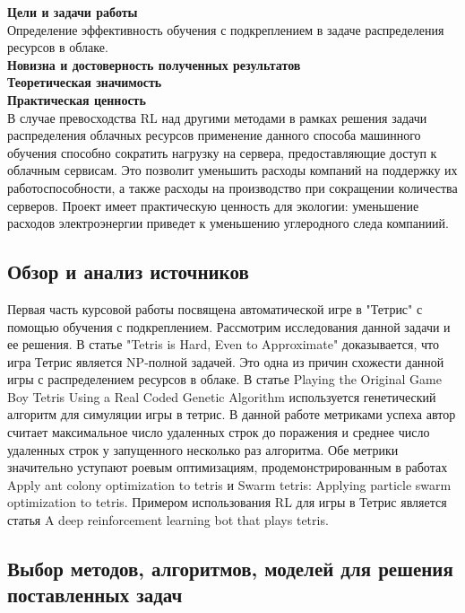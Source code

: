 \documentclass{article}
\begin{document}
\textbf{Цели и задачи работы}\\
Определение эффективность обучения с подкреплением в задаче распределения ресурсов в облаке.\\
\textbf{Новизна и достоверность полученных результатов}\\
\textbf{Теоретическая значимость}\\
\textbf{Практическая ценность}\\
В случае превосходства RL над другими методами в рамках решения задачи распределения облачных ресурсов применение данного способа машинного обучения способно сократить нагрузку на сервера, предоставляющие доступ к облачным сервисам. Это позволит уменьшить расходы компаний на поддержку их работоспособности, а также расходы на производство при сокращении количества серверов. Проект имеет практическую ценность для экологии: уменьшение расходов электроэнергии приведет к уменьшению углеродного следа компаниий.	\\
\newpage
\begin{center}
\section {Обзор и анализ источников}
\end{center}
Первая часть курсовой работы посвящена автоматической игре в "Тетрис" с помощью обучения с подкреплением. Рассмотрим исследования данной задачи и ее решения. В статье "Tetris is Hard, Even to Approximate"\cite{litlink5} доказывается, что игра Тетрис является NP-полной задачей. Это одна из причин схожести данной игры с распределением ресурсов в облаке\cite{litlink6}. В статье Playing the Original Game Boy Tetris Using a Real Coded Genetic Algorithm\cite{litlink7} используется генетический алгоритм для симуляции игры в тетрис. В данной работе метриками успеха автор считает максимальное число удаленных строк до поражения и среднее число удаленных строк у запущенного несколько раз алгоритма. Обе метрики значительно уступают роевым оптимизациям,  продемонстрированным в работах Apply ant colony optimization to tetris\cite{litlink8} и Swarm tetris: Applying particle swarm optimization to tetris\cite{litlink9}. Примером использования RL для игры в Тетрис является статья A deep reinforcement learning bot that plays tetris\cite{litlink10}.
\newpage
\begin{center}
\section {Выбор методов, алгоритмов, моделей для решения поставленных задач}
\end{center}
\end{document}
